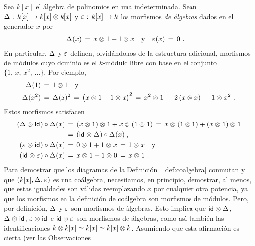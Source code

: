\begin{ejemploCoalgebra}\label{ejemplo:coalgebradepolinomios}
	Sea $k[x]$ el \'{a}lgebra de polinomios en una indeterminada. Sean
	$\Delta_{}:\,k[x]\rightarrow k[x]\otimes_{} k[x]$ y
	$\varepsilon_{}:\,k[x]\rightarrow k$ los morfismos \emph{de \'{a}lgebras}
	dados en el generador $x$ por
	\begin{align*}
		\Delta_{}(x) \,=\,x\otimes_{} 1 + 1\otimes_{} x
			& \quad\text{y}\quad
		\varepsilon_{}(x) \,=\,0
		\text{ .}
	\end{align*}
	En particular, $\Delta_{}$ y $\varepsilon_{}$ definen, olvid\'{a}ndonos de
	la estructura adicional, morfismos de m\'{o}dulos cuyo dominio es el
	$k$-m\'{o}dulo libre con base en el conjunto $\{1,\,x,\,x^2,\,\dots\}$.
	Por ejemplo,
	\begin{align*}
		\Delta_{}(1) & \,=\,1\otimes_{} 1 \quad\text{y} \\
		\Delta_{}(x^2) & \,=\,\Delta_{}(x)^2 \,=\,
			\big(x\otimes_{} 1 + 1\otimes_{} x\big)^2 \,=\,
			x^2\otimes_{} 1 \,+\, 2\,(x\otimes_{} x) \,+\, 1\otimes_{} x^2
		\text{ .}
	\end{align*}
	Estos morfismos satisfacen
	\begin{align*}
		(\Delta_{}\otimes_{}\mathsf{id}_{})\circ\Delta_{}(x) & \,=\,
			(x\otimes_{} 1)\otimes_{} 1 + x \otimes_{} (1\otimes_{} 1) \,=\,
			x\otimes_{} (1\otimes_{} 1) + (x\otimes_{} 1)\otimes_{} 1 \\
		& \,=\, (\mathsf{id}_{}\otimes_{}\Delta_{})\circ\Delta_{}(x) \text{ ,} \\
		(\varepsilon_{}\otimes_{}\mathsf{id}_{})\circ\Delta_{}(x) & \,=\,
			0\otimes_{} 1 + 1\otimes_{} x \,=\, 1\otimes_{} x
			\quad\text{y} \\
		(\mathsf{id}_{}\otimes_{}\varepsilon_{})\circ\Delta_{}(x) & \,=\,
			x\otimes_{} 1 + 1\otimes_{} 0 \,=\, x\otimes_{} 1
		\text{ .}
	\end{align*}
	Para demostrar que los diagramas de la Definici\'{o}n~%
	\ref{def:coalgebra} conmutan y que $(k[x],\Delta_{},\varepsilon_{})$
	es una co\'{a}lgebra, necesitamos, en principio, demostrar, al menos,
	que estas igualdades son v\'{a}lidas reemplazando $x$ por cualquier
	otra potencia, ya que los morfismos en la definici\'{o}n de
	co\'{a}lgebra son morfismos de m\'{o}dulos. Pero, por definici\'{o}n,
	$\Delta_{}$ y $\varepsilon_{}$ son morfismos de \'{a}lgebras. Esto implica
	que $\mathsf{id}_{}\otimes_{}\Delta_{}$, $\Delta_{}\otimes_{}\mathsf{id}_{}$,
	$\varepsilon_{}\otimes_{}\mathsf{id}_{}$ e $\mathsf{id}_{}\otimes_{}\varepsilon_{}$ son morfismos de
	\'{a}lgebras, como as\'{\i} tambi\'{e}n las identificaciones
	$k\otimes_{} k[x]\simeq k[x]\simeq k[x]\otimes_{} k$. Asumiendo que esta
	afirmaci\'{o}n es cierta (ver las Observaciones~%

\end{ejemploCoalgebra}
